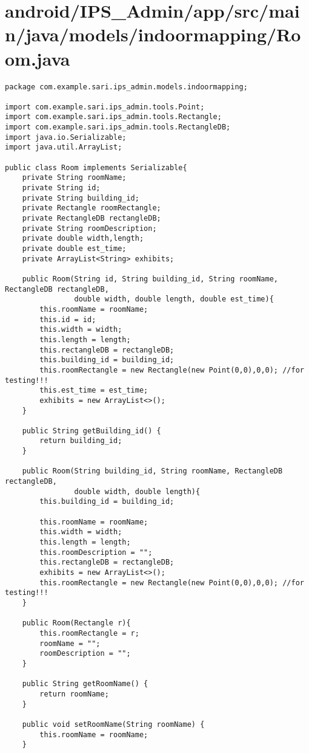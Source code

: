 \section{android/IPS\_Admin/app/src/main/java/models/indoormapping/Room.java}
\begin{lstlisting}package com.example.sari.ips_admin.models.indoormapping;

import com.example.sari.ips_admin.tools.Point;
import com.example.sari.ips_admin.tools.Rectangle;
import com.example.sari.ips_admin.tools.RectangleDB;
import java.io.Serializable;
import java.util.ArrayList;

public class Room implements Serializable{
    private String roomName;
    private String id;
    private String building_id;
    private Rectangle roomRectangle;
    private RectangleDB rectangleDB;
    private String roomDescription;
    private double width,length;
    private double est_time;
    private ArrayList<String> exhibits;

    public Room(String id, String building_id, String roomName, RectangleDB rectangleDB,
                double width, double length, double est_time){
        this.roomName = roomName;
        this.id = id;
        this.width = width;
        this.length = length;
        this.rectangleDB = rectangleDB;
        this.building_id = building_id;
        this.roomRectangle = new Rectangle(new Point(0,0),0,0); //for testing!!!
        this.est_time = est_time;
        exhibits = new ArrayList<>();
    }

    public String getBuilding_id() {
        return building_id;
    }

    public Room(String building_id, String roomName, RectangleDB rectangleDB,
                double width, double length){
        this.building_id = building_id;

        this.roomName = roomName;
        this.width = width;
        this.length = length;
        this.roomDescription = "";
        this.rectangleDB = rectangleDB;
        exhibits = new ArrayList<>();
        this.roomRectangle = new Rectangle(new Point(0,0),0,0); //for testing!!!
    }

    public Room(Rectangle r){
        this.roomRectangle = r;
        roomName = "";
        roomDescription = "";
    }

    public String getRoomName() {
        return roomName;
    }

    public void setRoomName(String roomName) {
        this.roomName = roomName;
    }


\end{lstlisting}
